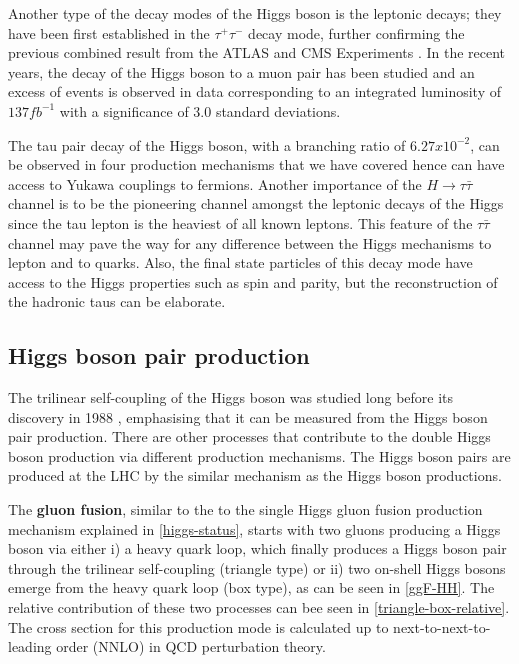 Another type of the decay modes of the Higgs boson is the leptonic decays; they have been first established in the $\tau^+\tau^-$ decay mode\cite{CMS-PAS-HIG-16-043}, further confirming the previous combined result from the ATLAS and CMS Experiments \cite{Aad2016}. In the recent years, the decay of the Higgs boson to a muon pair has been studied and an excess of events is observed in data corresponding to an integrated luminosity of $137 fb^{-1}$ with a significance of 3.0 standard deviations\cite{CMS-PAS-HIG-19-006}.

The tau pair decay of the Higgs boson, with a branching ratio of $6.27x10^{-2}$, can be observed in four production mechanisms that we have covered hence can have access to Yukawa couplings to fermions. Another importance of the $H\rightarrow\tau\bar\tau$ channel is to be the pioneering channel amongst the leptonic decays of the Higgs since the tau lepton is the heaviest of all known leptons. This feature of the $\tau\bar\tau$ channel may pave the way for any difference between the Higgs mechanisms to lepton and to quarks. Also, the final state particles of this decay mode have access to the Higgs properties such as spin and parity, but the reconstruction of the hadronic taus can be elaborate. 

\subsection{Higgs boson pair production}

The trilinear self-coupling of the Higgs boson was studied long before its discovery in 1988 \cite{GLOVER1988282}, emphasising that it can be measured from the Higgs boson pair production. There are other processes that contribute to the double Higgs boson production via different production mechanisms. The Higgs boson pairs are produced at the LHC by the similar mechanism as the Higgs boson productions. 

The \textbf{gluon fusion}, similar to the to the single Higgs gluon fusion production mechanism explained in \autoref{higgs-status}, starts with two gluons producing a Higgs boson via either i) a heavy quark loop, which finally produces a Higgs boson pair through the trilinear self-coupling (triangle type) or ii) two on-shell Higgs bosons emerge from the heavy quark loop (box type), as can be seen in \autoref{ggF-HH}. The relative contribution of these two processes can bee seen in \autoref{triangle-box-relative}. The cross section for this production mode is calculated up to next-to-next-to-leading order (NNLO) in QCD perturbation theory\cite{deFlorian2016}.

